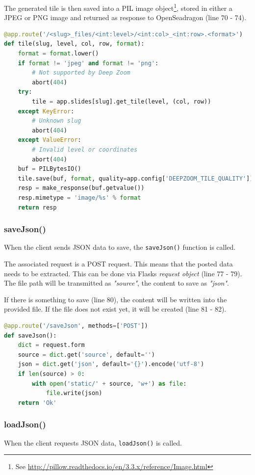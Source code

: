 The generated tile is then saved into a PIL image object\footnote{See \url{http://pillow.readthedocs.io/en/3.3.x/reference/Image.html}}, stored in either a JPEG or PNG image and returned as response to OpenSeadragon (line 70 - 74).

\begin{lstlisting}[language=Python, frame=single]
@app.route('/<slug>_files/<int:level>/<int:col>_<int:row>.<format>')
def tile(slug, level, col, row, format):
	format = format.lower()
	if format != 'jpeg' and format != 'png':
		# Not supported by Deep Zoom
		abort(404)
	try:
		tile = app.slides[slug].get_tile(level, (col, row))
	except KeyError:
		# Unknown slug
		abort(404)
	except ValueError:
		# Invalid level or coordinates
		abort(404)
	buf = PILBytesIO()
	tile.save(buf, format, quality=app.config['DEEPZOOM_TILE_QUALITY'])
	resp = make_response(buf.getvalue())
	resp.mimetype = 'image/%s' % format
	return resp
\end{lstlisting}


\subsubsection{saveJson()}
When the client sends JSON data to save, the \texttt{saveJson()} function is called.

The associated request is a POST request. This means that the posted data needs to be extracted. This can be done via Flasks \emph{request object} (line 77 - 79). The file path will be transmitted as \emph{"source"}, the content to save as \emph{"json"}.

If there is something to save (line 80), the content will be written into the provided file. If the file does not exist yet, it will be created (line 81 - 82).

\begin{lstlisting}[language=Python, frame=single]
@app.route('/saveJson', methods=['POST'])
def saveJson():
	dict = request.form
	source = dict.get('source', default='')
	json = dict.get('json', default='{}').encode('utf-8')
	if len(source) > 0:
		with open('static/' + source, 'w+') as file:
			file.write(json)
	return 'Ok'
\end{lstlisting}


\subsubsection{loadJson()}
When the client requests JSON data, \texttt{loadJson()} is called.

